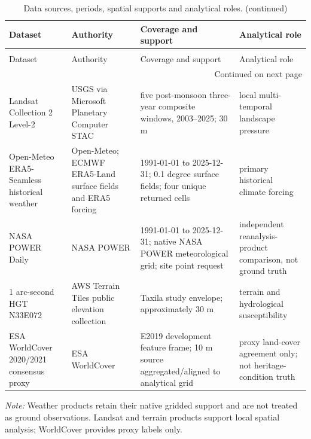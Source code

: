 \begingroup
\small
\setlength{\tabcolsep}{3pt}
\begin{longtable}{p{}p{}p{}p{}}
\caption{Data sources, periods, spatial supports and analytical roles.}\label{tab:data-sources}\\
\toprule
Dataset & Authority & Coverage and support & Analytical role \\
\midrule
\endfirsthead
\caption[]{Data sources, periods, spatial supports and analytical roles. (continued)}\\
\toprule
Dataset & Authority & Coverage and support & Analytical role \\
\midrule
\endhead
\midrule
\multicolumn{4}{r}{Continued on next page}\\
\endfoot
\bottomrule
\endlastfoot
Landsat Collection 2 Level-2 & USGS via Microsoft Planetary Computer STAC & five post-monsoon three-year composite windows, 2003--2025; 30 m & local multi-temporal landscape pressure \\
Open-Meteo ERA5-Seamless historical weather & Open-Meteo; ECMWF ERA5-Land surface fields and ERA5 forcing & 1991-01-01 to 2025-12-31; 0.1 degree surface fields; four unique returned cells & primary historical climate forcing \\
NASA POWER Daily & NASA POWER & 1991-01-01 to 2025-12-31; native NASA POWER meteorological grid; site point request & independent reanalysis-product comparison, not ground truth \\
1 arc-second HGT N33E072 & AWS Terrain Tiles public elevation collection & Taxila study envelope; approximately 30 m & terrain and hydrological susceptibility \\
ESA WorldCover 2020/2021 consensus proxy & ESA WorldCover & E2019 development feature frame; 10 m source aggregated/aligned to analytical grid & proxy land-cover agreement only; not heritage-condition truth \\
\end{longtable}
\noindent\textit{Note:} Weather products retain their native gridded support and are not treated as ground observations. Landsat and terrain products support local spatial analysis; WorldCover provides proxy labels only.
\endgroup
